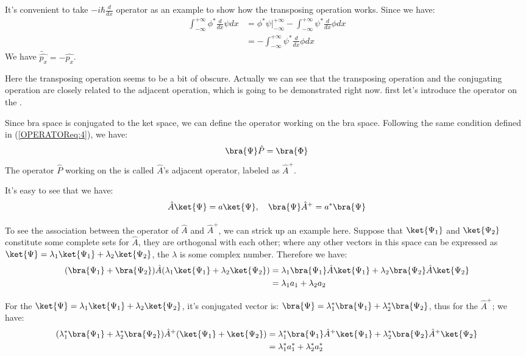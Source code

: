 It's convenient to take $-i\hbar\frac{d}{dx}$ operator as an example
to show how the transposing operation works. Since we have:
\begin{align}\label{OPERATOReq:3}
\int^{+\infty}_{-\infty}\phi^{*}\frac{d}{dx}\psi dx &=
\phi^{*}\psi|^{+\infty}_{-\infty} -
\int^{+\infty}_{-\infty}\psi^{*}\frac{d}{dx}\phi dx \nonumber \\
&= - \int^{+\infty}_{-\infty}\psi^{*}\frac{d}{dx}\phi dx
\end{align}
We have $\widetilde{\hat{p_{x}}} = -\hat{p_{x}}$.

Here the transposing operation seems to be a bit of obscure. Actually
we can see that the transposing operation and the conjugating
operation are closely related to the adjacent operation, which is
going to be demonstrated right now.  first let's introduce the
operator on the \brat{\Psi}.

Since bra space is conjugated to the ket space, we can define the
operator working on the bra space. Following the same condition
defined in (\ref{OPERATOReq:4}), we have:
\begin{equation}\label{}
\bra{\Psi}\hat{P} = \bra{\Phi}
\end{equation}
The operator $\hat{P}$ working on the \brat{\Psi} is called
$\hat{A}$'s adjacent operator, labeled as $\hat{A}^{+}$.

It's easy to see that we have:
\begin{equation}\label{}
\hat{A} \ket{\Psi} = a\ket{\Psi}, \quad  \bra{\Psi}\hat{A}^{+} =
a^{*}\bra{\Psi}
\end{equation}

To see the association between the operator of $\hat{A}$ and
$\hat{A}^{+}$, we can strick up an example here. Suppose that
$\ket{\Psi_{1}}$ and $\ket{\Psi_{2}}$ constitute some complete sets
for $\hat{A}$, they are orthogonal with each other; where any other
vectors in this space can be expressed as $\ket{\Psi} =
\lambda_{1}\ket{\Psi_{1}} + \lambda_{2}\ket{\Psi_{2}}$, the
$\lambda$ is some complex number. Therefore we have:
\begin{align}\label{}
(\bra{\Psi_{1}} + \bra{\Psi_{2}})\hat{A}(\lambda_{1}\ket{\Psi_{1}} +
\lambda_{2}\ket{\Psi_{2}}) &=
\lambda_{1}\bra{\Psi_{1}}\hat{A}\ket{\Psi_{1}} +
\lambda_{2}\bra{\Psi_{2}}\hat{A}\ket{\Psi_{2}}  \nonumber \\
&= \lambda_{1}a_{1} + \lambda_{2}a_{2}
\end{align}

For the $\ket{\Psi} = \lambda_{1}\ket{\Psi_{1}} +
\lambda_{2}\ket{\Psi_{2}}$, it's conjugated vector is: $\bra{\Psi} =
\lambda_{1}^{*}\bra{\Psi_{1}} + \lambda_{2}^{*}\bra{\Psi_{2}}$, thus
for the $\hat{A}^{+}$; we have:
\begin{align}\label{}
(\lambda_{1}^{*}\bra{\Psi_{1}} +
\lambda_{2}^{*}\bra{\Psi_{2}})\hat{A}^{+}(\ket{\Psi_{1}} +
\ket{\Psi_{2}}) &=
\lambda_{1}^{*}\bra{\Psi_{1}}\hat{A}^{+}\ket{\Psi_{1}} +
\lambda_{2}^{*}\bra{\Psi_{2}}\hat{A}^{+}\ket{\Psi_{2}}  \nonumber \\
&= \lambda_{1}^{*}a_{1}^{*} + \lambda_{2}^{*}a_{2}^{*}
\end{align}

